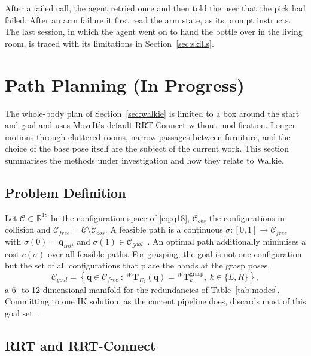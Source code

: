\documentclass[12pt,a4paper]{article}
\begin{document}
After a failed call, the agent retried once and then told the user that the pick had failed. After an
arm failure it first read the arm state, as its prompt instructs. The last session, in which the agent went on to hand the bottle over in the living room, is traced
with its limitations in Section~\ref{sec:skills}.

\section{Path Planning (In Progress)}
\label{sec:planning}

The whole-body plan of Section~\ref{sec:walkie} is limited to a box around the start and goal and
uses MoveIt's default RRT-Connect without modification. Longer motions through cluttered rooms,
narrow passages between furniture, and the choice of the base pose itself are the subject of the
current work. This section summarises the methods under investigation and how they relate to Walkie.

\subsection{Problem Definition}

Let $\mathcal{C}\subset\mathbb{R}^{18}$ be the configuration space of \eqref{eq:q18},
$\mathcal{C}_{obs}$ the configurations in collision and
$\mathcal{C}_{free}=\mathcal{C}\setminus\mathcal{C}_{obs}$. A feasible path is a continuous
$\sigma:[0,1]\to\mathcal{C}_{free}$ with $\sigma(0)=\mathbf{q}_{init}$ and
$\sigma(1)\in\mathcal{C}_{goal}$~\cite{chai2022}. An optimal path additionally minimises a cost
$c(\sigma)$ over all feasible paths. For grasping, the goal is not one configuration but the set of
all configurations that place the hands at the grasp poses,
\begin{equation}
    \mathcal{C}_{goal}=\left\{\mathbf{q}\in\mathcal{C}_{free}\ :\ {}^{W}\mathbf{T}_{E_k}(\mathbf{q})={}^{W}\mathbf{T}_{k}^{\mathrm{grasp}},\ k\in\{L,R\}\right\},
\end{equation}
a 6- to 12-dimensional manifold for the redundancies of Table~\ref{tab:modes}. Committing to one IK
solution, as the current pipeline does, discards most of this goal set~\cite{vahrenkamp2010}.

\subsection{RRT and RRT-Connect}
\end{document}
